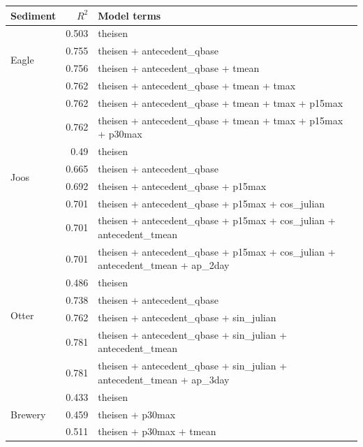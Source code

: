 \documentclass[12pt]{article}
\begin{document}



\begin{table}[h] \small
    \begin{center}
    \begin{tabular}{lrl}
    \textbf{Sediment} & $R^2$ & Model terms \\
    \hline
    \multirow{4}{*}{Eagle} & 0.503 & theisen\\
    & 0.755 & theisen + antecedent\_qbase\\
    & 0.756 & theisen + antecedent\_qbase + tmean\\
    & 0.762 & theisen + antecedent\_qbase + tmean + tmax \\
    & 0.762 & theisen + antecedent\_qbase + tmean + tmax + p15max \\
    & 0.762 & theisen + antecedent\_qbase + tmean + tmax + p15max + p30max
    \vspace{2mm}\\
    \multirow{4}{*}{Joos} & 0.49 & theisen\\
    & 0.665 & theisen + antecedent\_qbase\\
    & 0.692 & theisen + antecedent\_qbase + p15max\\
    & 0.701 & theisen + antecedent\_qbase + p15max + cos\_julian \\
    & 0.701 & theisen + antecedent\_qbase + p15max + cos\_julian + antecedent\_tmean\\
    & 0.701 & theisen + antecedent\_qbase + p15max + cos\_julian + antecedent\_tmean + ap\_2day
    \vspace{2mm}\\
    \multirow{4}{*}{Otter} & 0.486 & theisen\\
    & 0.738 & theisen + antecedent\_qbase\\
    & 0.762 & theisen + antecedent\_qbase + sin\_julian\\
    & 0.781 & theisen + antecedent\_qbase + sin\_julian + antecedent\_tmean \\
    & 0.781 & theisen + antecedent\_qbase + sin\_julian + antecedent\_tmean + ap\_3day
    \vspace{2mm}\\
    \multirow{3}{*}{Brewery} & 0.433 & theisen\\
    & 0.459 & theisen + p30max\\
    & 0.511 & theisen + p30max + tmean
    \vspace{6mm}\\


\end{tabular}
\end{center}
\end{table}
\end{document}
